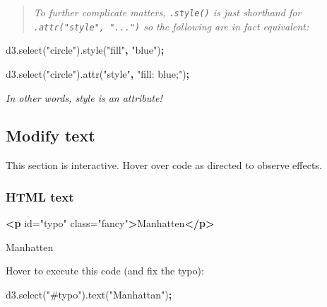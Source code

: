 \documentclass[openany]{book}
\newenvironment{Shaded}{\begin{snugshade}}{\end{snugshade}}
\newcommand{\AttributeTok}[1]{\textcolor[rgb]{0.77,0.63,0.00}{#1}}
\newcommand{\KeywordTok}[1]{\textcolor[rgb]{0.13,0.29,0.53}{\textbf{#1}}}
\newcommand{\NormalTok}[1]{#1}
\newcommand{\OperatorTok}[1]{\textcolor[rgb]{0.81,0.36,0.00}{\textbf{#1}}}
\newcommand{\OtherTok}[1]{\textcolor[rgb]{0.56,0.35,0.01}{#1}}
\newcommand{\StringTok}[1]{\textcolor[rgb]{0.31,0.60,0.02}{#1}}
\newcommand{\VariableTok}[1]{\textcolor[rgb]{0.00,0.00,0.00}{#1}}
\begin{document}
\begin{quote}
 \emph{To further complicate matters, \texttt{.style()} is just shorthand for \texttt{.attr("style",\ "...")} so the following are in fact equivalent:}
\end{quote}

\begin{Shaded}
\begin{Highlighting}[]
\VariableTok{d3}\NormalTok{.}\AttributeTok{select}\NormalTok{(}\StringTok{"circle"}\NormalTok{).}\AttributeTok{style}\NormalTok{(}\StringTok{"fill"}\OperatorTok{,} \StringTok{"blue"}\NormalTok{)}\OperatorTok{;}

\VariableTok{d3}\NormalTok{.}\AttributeTok{select}\NormalTok{(}\StringTok{"circle"}\NormalTok{).}\AttributeTok{attr}\NormalTok{(}\StringTok{"style"}\OperatorTok{,} \StringTok{"fill: blue;"}\NormalTok{)}\OperatorTok{;}
\end{Highlighting}
\end{Shaded}

\emph{In other words, style is an attribute!}

\hypertarget{modify-text}{%
\subsection{Modify text}\label{modify-text}}

This section is interactive. Hover over code as directed to observe effects.

\hypertarget{html-text}{%
\subsubsection*{HTML text}\label{html-text}}

\begin{Shaded}
\begin{Highlighting}[]
\KeywordTok{<p}\OtherTok{ id=}\StringTok{"typo"}\OtherTok{ class=}\StringTok{"fancy"}\KeywordTok{>}\NormalTok{Manhatten}\KeywordTok{</p>}
\end{Highlighting}
\end{Shaded}

Manhatten

Hover to execute this code (and fix the typo):

\hypertarget{fixtypo}{}
\begin{Shaded}
\begin{Highlighting}[]
\VariableTok{d3}\NormalTok{.}\AttributeTok{select}\NormalTok{(}\StringTok{"#typo"}\NormalTok{).}\AttributeTok{text}\NormalTok{(}\StringTok{"Manhattan"}\NormalTok{)}\OperatorTok{;}
\end{Highlighting}
\end{Shaded}
\end{document}
